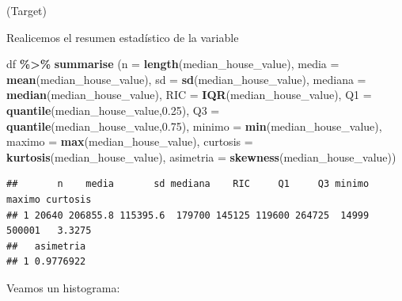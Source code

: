 \documentclass[
]{book}
\newenvironment{Shaded}{\begin{snugshade}}{\end{snugshade}}
\newcommand{\AttributeTok}[1]{\textcolor[rgb]{0.13,0.29,0.53}{#1}}
\newcommand{\FloatTok}[1]{\textcolor[rgb]{0.00,0.00,0.81}{#1}}
\newcommand{\FunctionTok}[1]{\textcolor[rgb]{0.13,0.29,0.53}{\textbf{#1}}}
\newcommand{\NormalTok}[1]{#1}
\newcommand{\SpecialCharTok}[1]{\textcolor[rgb]{0.81,0.36,0.00}{\textbf{#1}}}
\begin{document}
(Target)

Realicemos el resumen estadístico de la variable

\begin{Shaded}
\begin{Highlighting}[]
\NormalTok{df }\SpecialCharTok{\%\textgreater{}\%} \FunctionTok{summarise}\NormalTok{ (}\AttributeTok{n =} \FunctionTok{length}\NormalTok{(median\_house\_value),}
                  \AttributeTok{media =} \FunctionTok{mean}\NormalTok{(median\_house\_value),}
                  \AttributeTok{sd =} \FunctionTok{sd}\NormalTok{(median\_house\_value),}
                  \AttributeTok{mediana =} \FunctionTok{median}\NormalTok{(median\_house\_value),}
                  \AttributeTok{RIC =} \FunctionTok{IQR}\NormalTok{(median\_house\_value),}
                  \AttributeTok{Q1 =} \FunctionTok{quantile}\NormalTok{(median\_house\_value,}\FloatTok{0.25}\NormalTok{),}
                  \AttributeTok{Q3 =} \FunctionTok{quantile}\NormalTok{(median\_house\_value,}\FloatTok{0.75}\NormalTok{),}
                  \AttributeTok{minimo =} \FunctionTok{min}\NormalTok{(median\_house\_value),}
                  \AttributeTok{maximo =} \FunctionTok{max}\NormalTok{(median\_house\_value),}
                  \AttributeTok{curtosis =} \FunctionTok{kurtosis}\NormalTok{(median\_house\_value),}
                  \AttributeTok{asimetria =} \FunctionTok{skewness}\NormalTok{(median\_house\_value))}
\end{Highlighting}
\end{Shaded}

\begin{verbatim}
##       n    media       sd mediana    RIC     Q1     Q3 minimo maximo curtosis
## 1 20640 206855.8 115395.6  179700 145125 119600 264725  14999 500001   3.3275
##   asimetria
## 1 0.9776922
\end{verbatim}

Veamos un histograma:
\end{document}
